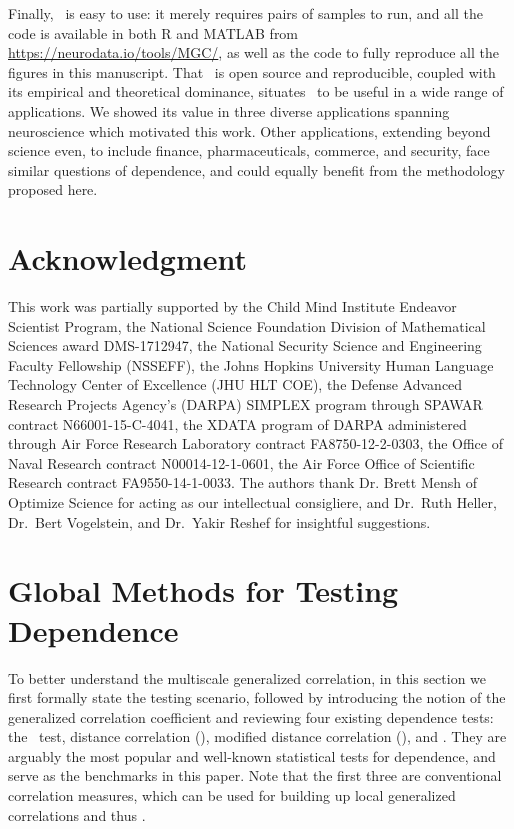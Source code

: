 \documentclass[11pt]{article}
\begin{document}
 

Finally, \Mgc~is easy to use: it merely requires pairs of samples to run, and all the code is available in both R and MATLAB from \url{https://neurodata.io/tools/MGC/}, as well as the code to fully reproduce all the figures in this manuscript.  That \Mgc~is open source and reproducible, coupled with its empirical and theoretical dominance, situates \Mgc~to be useful in a wide range of applications.  We showed its value in three diverse applications spanning neuroscience which motivated this work. Other applications, extending beyond science even, to include finance, pharmaceuticals, commerce, and security, face similar questions of dependence, and could equally benefit from the methodology proposed here.   


\clearpage
\pagestyle{empty}




\section*{Acknowledgment}
This work was partially supported by
the Child Mind Institute Endeavor Scientist Program,
%
the National Science Foundation Division of Mathematical Sciences award DMS-1712947,
%
the National Security Science and Engineering Faculty Fellowship (NSSEFF),
%
the Johns Hopkins University Human Language Technology Center of Excellence (JHU HLT COE),  
%
the Defense Advanced Research Projects Agency's (DARPA) SIMPLEX program through SPAWAR contract N66001-15-C-4041,
%
the XDATA program of DARPA administered through Air Force Research Laboratory contract FA8750-12-2-0303,
%
the Office of Naval Research contract N00014-12-1-0601,
%
the Air Force Office of Scientific Research contract FA9550-14-1-0033. 
%
The authors thank Dr. Brett Mensh of Optimize Science for acting as our intellectual consigliere, and Dr.~Ruth Heller, Dr.~Bert Vogelstein,  and Dr.~Yakir Reshef for insightful suggestions.


\clearpage
\appendix
\setcounter{figure}{0}
\renewcommand{\thealgorithm}{C\arabic{algorithm}}
\renewcommand{\thefigure}{E\arabic{figure}}
\renewcommand{\thesubsection}{\thesection.\Roman{subsection}}
\renewcommand{\thesubsubsection}{\thesubsection.\arabic{subsubsection}}

\section{Global Methods for Testing Dependence}
\label{appen:global}
To better understand the multiscale generalized correlation, in this section we first formally state the testing scenario, followed by introducing the notion of the generalized correlation coefficient and reviewing four existing dependence tests: the \Mantel~test, distance correlation (\Dcorr), modified distance correlation (\Mcorr), and \Hhg. They are arguably the most popular and well-known statistical tests for dependence, and serve as the benchmarks in this paper. Note that the first three are conventional correlation measures, which can be used for building up local generalized correlations and thus  \Mgc.
\end{document}
